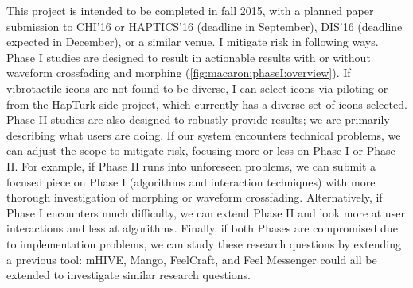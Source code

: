 This project is intended to be completed in fall 2015, with a planned paper submission to CHI'16 or HAPTICS'16 (deadline in September), DIS'16 (deadline expected in December), or a similar venue.
I mitigate risk in following ways.
Phase I studies are designed to result in actionable results with or without waveform crossfading and morphing (\autoref{fig:macaron:phaseI:overview}).
If vibrotactile icons are not found to be diverse, I can select icons via piloting or from the HapTurk side project, which currently has a diverse set of icons selected.
Phase II studies are also designed to robustly provide results; we are primarily describing what users are doing.
If our system encounters technical problems, we can adjust the scope to mitigate risk, focusing more or less on Phase I or Phase II.
For example, if Phase II runs into unforeseen problems, we can submit a focused piece on Phase I (algorithms and interaction techniques) with more thorough investigation of morphing or waveform crossfading.
Alternatively, if Phase I encounters much difficulty, we can extend Phase II and look more at user interactions and less at algorithms.
Finally, if both Phases are compromised due to implementation problems, we can study these research questions by extending a previous tool: mHIVE, Mango, FeelCraft, and Feel Messenger could all be extended to investigate similar research questions.


